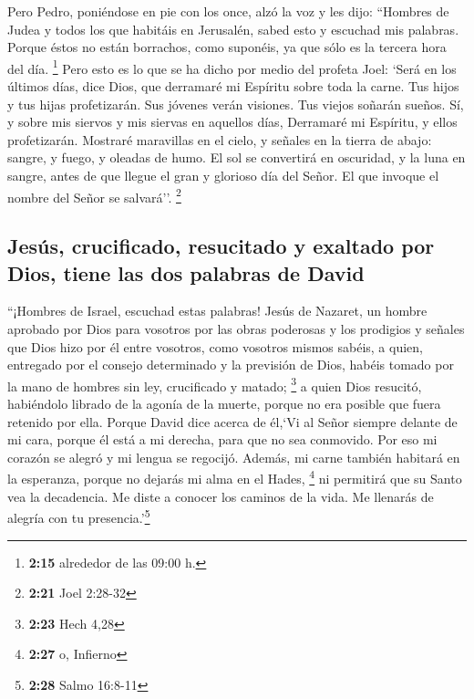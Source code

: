 \begin{paracol}{2}
 Pero Pedro, poniéndose en pie con los once, alzó la voz
y les dijo: ``Hombres de Judea y todos los que habitáis en Jerusalén,
sabed esto y escuchad mis palabras.  Porque éstos no
están borrachos, como suponéis, ya que sólo es la tercera hora del día.
\footnote{\textbf{2:15} alrededor de las 09:00 h.}  Pero
esto es lo que se ha dicho por medio del profeta Joel: 
`Será en los últimos días, dice Dios, que derramaré mi Espíritu sobre
toda la carne. Tus hijos y tus hijas profetizarán. Sus jóvenes verán
visiones. Tus viejos soñarán sueños.  Sí, y sobre mis
siervos y mis siervas en aquellos días, Derramaré mi Espíritu, y ellos
profetizarán.  Mostraré maravillas en el cielo, y señales
en la tierra de abajo: sangre, y fuego, y oleadas de humo.
 El sol se convertirá en oscuridad, y la luna en sangre,
antes de que llegue el gran y glorioso día del Señor.  El
que invoque el nombre del Señor se salvará''. \footnote{\textbf{2:21}
  Joel 2:28-32}

\hypertarget{jesuxfas-crucificado-resucitado-y-exaltado-por-dios-tiene-las-dos-palabras-de-david}{%
\subsection{Jesús, crucificado, resucitado y exaltado por Dios, tiene
las dos palabras de
David}\label{jesuxfas-crucificado-resucitado-y-exaltado-por-dios-tiene-las-dos-palabras-de-david}}

 ``¡Hombres de Israel, escuchad estas palabras! Jesús de
Nazaret, un hombre aprobado por Dios para vosotros por las obras
poderosas y los prodigios y señales que Dios hizo por él entre vosotros,
como vosotros mismos sabéis,  a quien, entregado por el
consejo determinado y la previsión de Dios, habéis tomado por la mano de
hombres sin ley, crucificado y matado; \footnote{\textbf{2:23} Hech 4,28}
 a quien Dios resucitó, habiéndolo librado de la agonía
de la muerte, porque no era posible que fuera retenido por ella.
 Porque David dice acerca de él,`Vi al Señor siempre
delante de mi cara, porque él está a mi derecha, para que no sea
conmovido.  Por eso mi corazón se alegró y mi lengua se
regocijó. Además, mi carne también habitará en la esperanza,
 porque no dejarás mi alma en el Hades, \footnote{\textbf{2:27}
  o, Infierno} ni permitirá que su Santo vea la decadencia.
 Me diste a conocer los caminos de la vida. Me llenarás
de alegría con tu presencia.'\footnote{\textbf{2:28} Salmo 16:8-11}


\end{paracol}
